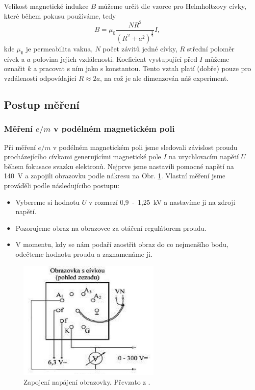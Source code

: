 \documentclass[english]{article}
\begin{document}
			Velikost magnetické indukce $B$ můžeme určit dle vzorce pro Helmholtzovy cívky, které během pokusu používáme, tedy
			\begin{equation}
			\label{eq:B_to_I}
			B = \mu_0 \frac{NR^2}{(R^2 + a^2)^{\frac{3}{2}}} I,
			\end{equation}
			kde $\mu_0$ je permeabilita vakua, $N$ počet závitů jedné cívky, $R$ střední poloměr cívek a $a$ polovina jejich vzdálenosti. Koeficient vystupující před $I$ můžeme označit $k$ a pracovat s ním jako s konstantou. Tento vztah platí (dobře) pouze pro vzdálenosti odpovídající $R \approx 2a$, na což je ale dimenzován náš experiment.

	\subsection{Postup měření}
		\subsubsection{Měření $e/m$ v podélném magnetickém poli}
			Při měření $e/m$ v podélném magnetickém poli jsme sledovali závislost proudu procházejícího cívkami generujícími magnetické pole $I$ na urychlovacím napětí $U$ během fokusace svazku elektronů. Nejprve jsme nastavili pomocné napětí na 140~V a zapojili obrazovku podle nákresu na Obr. \ref{fig:obrazek}. Vlastní měření jsme prováděli podle následujícího postupu:
			\begin{itemize}
				\item Vybereme si hodnotu $U$ v rozmezí 0,9~-~1,25~kV a nastavíme ji na zdroji napětí.
				\item Pozorujeme obraz na obrazovce za otáčení regulátorem proudu.
				\item V momentu, kdy se nám podaří zaostřit obraz do co nejmenšího bodu, odečteme hodnotu proudu a zaznamenáme ji.
			\end{itemize}
		
			\begin{figure}[h!]
			\centering
			\includegraphics[width=7cm]{att/obrazek.jpg}
			\caption{Zapojení napájení obrazovky. Převzato z \cite{bib:zadani}.}
			\label{fig:obrazek}
			\end{figure}			
			
\end{document}
